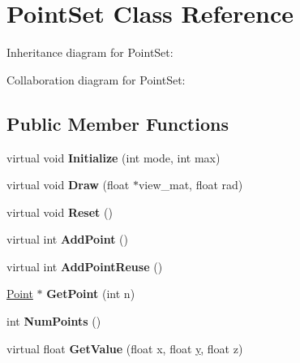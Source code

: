 \hypertarget{class_point_set}{\section{Point\+Set Class Reference}
\label{class_point_set}
}


Inheritance diagram for Point\+Set\+:


Collaboration diagram for Point\+Set\+:
\subsection*{Public Member Functions}
\begin{DoxyCompactItemize}
\item 
\hypertarget{class_point_set_ac0242bef8c13719f33ded6ae7db8f2e2}{virtual void {\bfseries Initialize} (int mode, int max)}\label{class_point_set_ac0242bef8c13719f33ded6ae7db8f2e2}

\item 
\hypertarget{class_point_set_ab30e9607c133e31a5296955a494dde0f}{virtual void {\bfseries Draw} (float $\ast$view\+\_\+mat, float rad)}\label{class_point_set_ab30e9607c133e31a5296955a494dde0f}

\item 
\hypertarget{class_point_set_aa23ff8f7f3c9add6214db783d6048ad9}{virtual void {\bfseries Reset} ()}\label{class_point_set_aa23ff8f7f3c9add6214db783d6048ad9}

\item 
\hypertarget{class_point_set_aa13585f6dac5381421b681d93df339db}{virtual int {\bfseries Add\+Point} ()}\label{class_point_set_aa13585f6dac5381421b681d93df339db}

\item 
\hypertarget{class_point_set_a9872b943ef85f942196cb9057b291af3}{virtual int {\bfseries Add\+Point\+Reuse} ()}\label{class_point_set_a9872b943ef85f942196cb9057b291af3}

\item 
\hypertarget{class_point_set_a45c8db13daa6d5a7afccd4e1d373091d}{\hyperlink{class_point}{Point} $\ast$ {\bfseries Get\+Point} (int n)}\label{class_point_set_a45c8db13daa6d5a7afccd4e1d373091d}

\item 
\hypertarget{class_point_set_a97126f98d0fbf9a287d0093c28cf8836}{int {\bfseries Num\+Points} ()}\label{class_point_set_a97126f98d0fbf9a287d0093c28cf8836}

\item 
\hypertarget{class_point_set_af480807fc74f3ce8d0b2b2388e586a8a}{virtual float {\bfseries Get\+Value} (float x, float \hyperlink{_ice_utils_8h_aa7ffaed69623192258fb8679569ff9ba}{y}, float z)}\label{class_point_set_af480807fc74f3ce8d0b2b2388e586a8a}


\end{DoxyCompactItemize}

